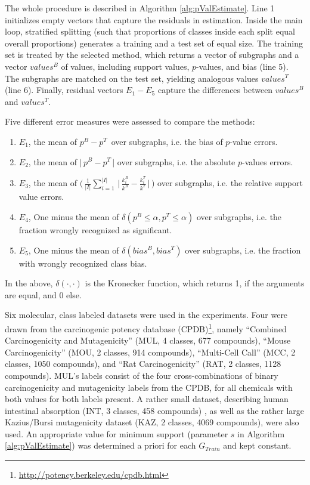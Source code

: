 \documentclass{sig-alternate}
\begin{document}
The whole procedure is described in Algorithm \ref{alg:pValEstimate}.
Line 1 initializes empty vectors that capture the residuals in estimation.
Inside the main loop, stratified splitting (such that proportions of classes
inside each split equal overall proportions) generates a training and a test
set of equal size. The training set is treated by the selected method, which
returns a vector of subgraphs and a vector $values^B$ of values,
including support values, $p$-values, and bias (line 5). The subgraphs are matched on
the test set, yielding analogous values $values^T$ (line 6). Finally, 
residual vectors $E_1-E_5$ capture the differences between $values^B$ and
$values^T$.

Five different
error measures were assessed to compare the methods:
\begin{enumerate}
  \item $E_1$, the mean of     $ p^B -p^T \,$                                                                                    over subgraphs, i.e. the bias of $p$-value errors.
  \item $E_2$, the mean of     $ \Big|\,p^B -p^T \,\Big|$                                                                        over subgraphs, i.e. the absolute $p$-values errors.
  \item $E_3$, the mean of     $ \Big(\,\frac{1}{|I|} \sum_{i=1}^{|I|} \,\Big|\,\frac{k^B_i}{k^B} - \frac{k^T_i}{k^T} \,\Big|\,\Big)$ over subgraphs, i.e. the relative support value errors.
  \item $E_4$, One minus the mean of $ \delta(p^B \le \alpha, p^T \le \alpha)$                                                         over subgraphs, i.e. the fraction wrongly recognized as significant.
  \item $E_5$, One minus the mean of $ \delta(bias^B, bias^T)$                                                                        over subgraphs, i.e. the fraction with wrongly recognized class bias.

\end{enumerate}
In the above, $\delta(\cdot,\cdot)$ is the Kronecker function, which returns 1, if the arguments are equal, and 0 else.

Six molecular, class labeled datasets were used in the experiments. 
Four were drawn from the carcinogenic potency database
(CPDB)\footnote{\url{http://potency.berkeley.edu/cpdb.html}}, namely 
``Combined Carcinogenicity and Mutagenicity'' (MUL, 4 classes, 677 compounds),
``Mouse Carcinogenicity'' (MOU, 2 classes, 914 compounds), 
``Multi-Cell Call'' (MCC, 2 classes, 1050 compounds), and 
``Rat Carcinogenicity'' (RAT, 2 classes, 1128 compounds). 
MUL's labels consist of the four cross-combinations of binary carcinogenicity
and mutagenicity labels from the CPDB, for all chemicals with both values for
both labels present.
A rather small dataset, describing human intestinal absorption (INT, 3 classes,
458 compounds) \cite{Suenderhauf10Combinatorial}, as well as the rather large
Kazius/Bursi mutagenicity dataset (KAZ, 2 classes, 4069 compounds),
\cite{kazius05derivation} were also used.  An appropriate value for minimum
support (parameter $s$ in Algorithm \ref{alg:pValEstimate}) was determined a
priori for each $G_{Train}$ and kept constant.
\end{document}
